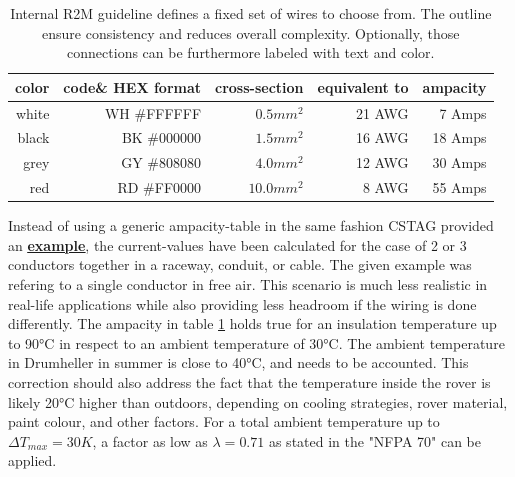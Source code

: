     \begin{table}[h] %
        \centering
        \begin{tabular}{|r|r|r|r|r|} \hline 
          color\footnotemark[1]&  code\footnotemark[2] \& HEX format&  cross-section\footnotemark[3]&  equivalent to&  ampacity\footnotemark[4] \\ \hline 
                          white&          WH \#FFFFFF&                    $0.5mm^2$&                          21 AWG&                 7 Amps    \\ \hline 
                          black&          BK \#000000&                    $1.5mm^2$&                          16 AWG&                18 Amps    \\ \hline 
                           grey&          GY \#808080&                    $4.0mm^2$&                          12 AWG&                30 Amps    \\ \hline 
                            red&          RD \#FF0000&                   $10.0mm^2$&                           8 AWG&                55 Amps    \\ \hline
        \end{tabular}
        \caption{Internal R2M guideline defines a fixed set of wires to choose from. The outline ensure consistency and reduces overall complexity. Optionally, those connections can be furthermore labeled with text and color.}
        \label{color_codes}
    \end{table}

    Instead of using a generic ampacity-table in the same fashion CSTAG provided an \href{https://web.archive.org/web/20230310184047/https://www.coonerwire.com/amp-chart/}{\textbf{\underline{example}}}, the current-values have been calculated for the case of 2 or 3 conductors together in a raceway, conduit, or cable. The given example was refering to a single conductor in free air. This scenario is much less realistic in real-life applications while also providing less headroom if the wiring is done differently. The ampacity in table \ref{color_codes} holds true for an insulation temperature up to 90°C in respect to an ambient temperature of 30°C. The ambient temperature in Drumheller in summer is close to 40°C, and needs to be accounted. This correction should also address the fact that the temperature inside the rover is likely 20°C higher than outdoors, depending on cooling strategies, rover material, paint colour, and other factors. For a total ambient temperature up to $\Delta T_{max} = 30K$, a factor as low as $\lambda = 0.71$ as stated in the "NFPA 70" can be applied.

